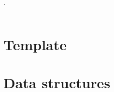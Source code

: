 

\def\title{UACJ - Codesnatchers}
.\\[0.2cm]
 \\[0.5cm]
\tableofcontents\newpage

\section{Template}
\section{Data structures}
